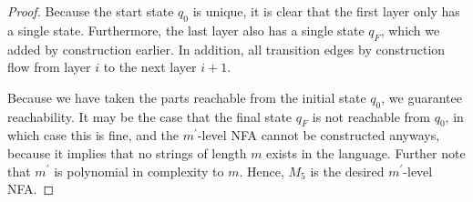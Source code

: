 \begin{proof}
  Because the start state \(q_0\) is unique, it is clear that
  the first layer only has a single state.
  Furthermore, the last layer also has a single state \(q_F\), which
  we added by construction earlier.
  In addition, all transition edges by construction flow from
  layer \(i\) to the next layer \(i + 1\).

  Because we have taken the parts reachable from the initial state \(q_0\),
  we guarantee reachability.
  It may be the case that the final state \(q_F\) is not reachable from
  \(q_0\), in which case this is fine,
  and the \(m^\prime\)-level NFA cannot be constructed anyways,
  because it implies that no strings of length \(m\) exists in
  the language.
  Further note that \(m^\prime\) is polynomial in complexity to \(m\).
  Hence, \(M_5\) is the desired \(m^\prime\)-level NFA.

\end{proof}



